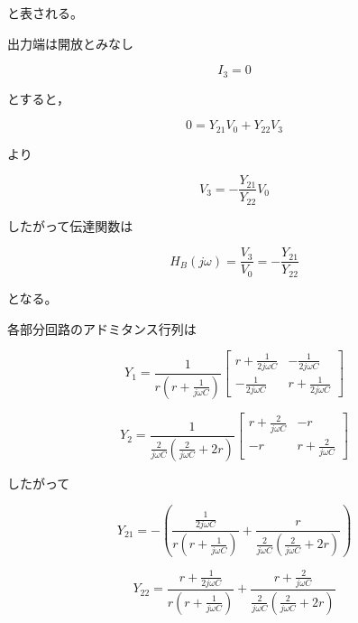 \documentclass[article]{jlreq}
\begin{document}
と表される。

出力端は開放とみなし

\begin{equation}
I_3=0
\end{equation}

とすると，

\begin{equation}
0=Y_{21}V_0+Y_{22}V_3
\end{equation}

より

\begin{equation}
V_3
=
-\frac{Y_{21}}{Y_{22}}V_0
\end{equation}

したがって伝達関数は

\begin{equation}
H_B(j\omega)
=
\frac{V_3}{V_0}
=
-\frac{Y_{21}}{Y_{22}}
\end{equation}

となる。

各部分回路のアドミタンス行列は

\begin{equation}
Y_1=
\frac{1}{
r\left(
r+\frac1{j\omega C}
\right)
}
\begin{bmatrix}
r+\frac1{2j\omega C}
&
-\frac1{2j\omega C}
\\
-\frac1{2j\omega C}
&
r+\frac1{2j\omega C}
\end{bmatrix}
\end{equation}

\begin{equation}
Y_2=
\frac1{
\frac2{j\omega C}
\left(
\frac2{j\omega C}+2r
\right)
}
\begin{bmatrix}
r+\frac2{j\omega C}
&
-r
\\
-r
&
r+\frac2{j\omega C}
\end{bmatrix}
\end{equation}

したがって

\begin{equation}
Y_{21}
=
-\left(
\frac{
\frac1{2j\omega C}
}{
r\left(
r+\frac1{j\omega C}
\right)
}
+
\frac{
r
}{
\frac2{j\omega C}
\left(
\frac2{j\omega C}+2r
\right)
}
\right)
\end{equation}

\begin{equation}
Y_{22}
=
\frac{
r+\frac1{2j\omega C}
}{
r\left(
r+\frac1{j\omega C}
\right)
}
+
\frac{
r+\frac2{j\omega C}
}{
\frac2{j\omega C}
\left(
\frac2{j\omega C}+2r
\right)
}
\end{equation}
\end{document}
